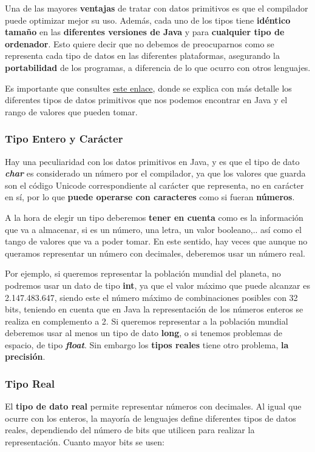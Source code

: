 Una de las mayores \textbf{ventajas} de tratar con datos primitivos es que el compilador puede optimizar mejor su uso. Además, cada uno de los tipos tiene \textbf{idéntico tamaño} en las \textbf{diferentes versiones de Java} y para \textbf{cualquier tipo de ordenador}. Esto quiere decir que no debemos de preocuparnos como se representa cada tipo de datos en las diferentes plataformas, asegurando la \textbf{portabilidad} de los programas, a diferencia de lo que ocurro con otros lenguajes.

Es importante que consultes \href{https://dcodingames.com/tipos-de-datos-en-java/}{este enlace}, donde se explica con más detalle los diferentes tipos de datos primitivos que nos podemos encontrar en Java y el rango de valores que pueden tomar.

\subsubsection{Tipo Entero y Carácter}

Hay una peculiaridad con los datos primitivos en Java, y es que el tipo de dato \textbf{\textit{char}} es considerado un número por el compilador, ya que los valores que guarda son el código Unicode correspondiente al carácter que representa, no en carácter en sí, por lo que \textbf{puede operarse con caracteres} como si fueran \textbf{números}.

A la hora de elegir un tipo deberemos \textbf{tener en cuenta} como es la información que va a almacenar, si es un número, una letra, un valor booleano,.. así como el tango de valores que va a poder tomar. En este sentido, hay veces que aunque no queramos representar un número con decimales, deberemos usar un número real.

Por ejemplo, si queremos representar la población mundial del planeta, no podremos usar un dato de tipo \textbf{int}, ya que el valor máximo que puede alcanzar es 2.147.483.647, siendo este el número máximo de combinaciones posibles con 32 bits, teniendo en cuenta que en Java la representación de los números enteros se realiza en complemento a 2. Si queremos representar a la población mundial deberemos usar al menos un tipo de dato \textbf{long}, o si tenemos problemas de espacio, de tipo \textbf{\textit{float}}. Sin embargo los \textbf{tipos reales} tiene otro problema, \textbf{la precisión}.

\subsubsection{Tipo Real}
El \textbf{tipo de dato real} permite representar números con decimales. Al igual que ocurre con los enteros, la mayoría de lenguajes define diferentes tipos de datos reales, dependiendo del número de bits que utilicen para realizar la representación. Cuanto mayor bits se usen:

